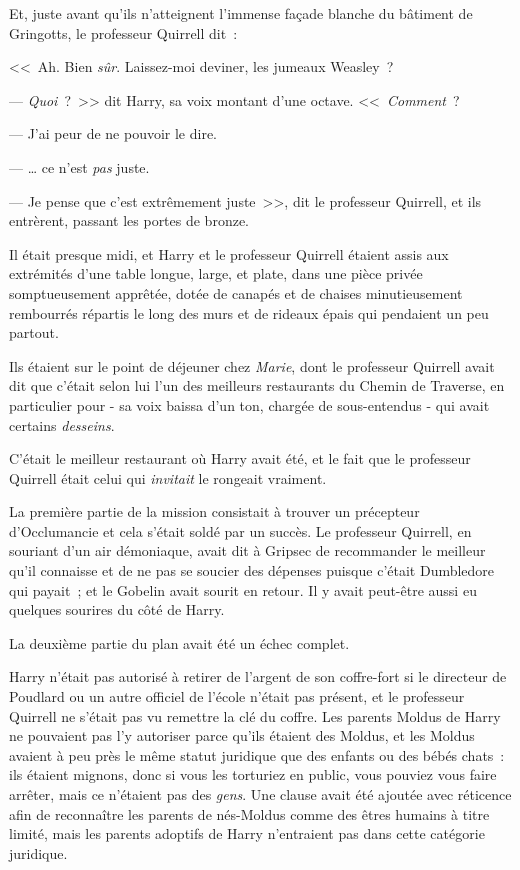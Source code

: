 Et, juste avant qu'ils n'atteignent l'immense façade blanche du bâtiment de Gringotts, le professeur Quirrell dit~:

<<~Ah. Bien \emph{sûr}. Laissez-moi deviner, les jumeaux Weasley~?

--- \emph{Quoi}~?~>> dit Harry, sa voix montant d'une octave. <<~\emph{Comment}~?

--- J'ai peur de ne pouvoir le dire.

--- … ce n'est \emph{pas} juste.

--- Je pense que c'est extrêmement juste~>>, dit le professeur Quirrell, et ils entrèrent, passant les portes de bronze.

\later

Il était presque midi, et Harry et le professeur Quirrell étaient assis aux extrémités d'une table longue, large, et plate, dans une pièce privée somptueusement apprêtée, dotée de canapés et de chaises minutieusement rembourrés répartis le long des murs et de rideaux épais qui pendaient un peu partout.

Ils étaient sur le point de déjeuner chez \emph{Marie}, dont le professeur Quirrell avait dit que c'était selon lui l'un des meilleurs restaurants du Chemin de Traverse, en particulier pour - sa voix baissa d'un ton, chargée de sous-entendus - qui avait certains \emph{desseins}.

C'était le meilleur restaurant où Harry avait été, et le fait que le professeur Quirrell était celui qui \emph{invitait} le rongeait vraiment.

La première partie de la mission consistait à trouver un précepteur d'Occlumancie et cela s'était soldé par un succès. Le professeur Quirrell, en souriant d'un air démoniaque, avait dit à Gripsec de recommander le meilleur qu'il connaisse et de ne pas se soucier des dépenses puisque c'était Dumbledore qui payait~; et le Gobelin avait sourit en retour. Il y avait peut-être aussi eu quelques sourires du côté de Harry.

La deuxième partie du plan avait été un échec complet.

Harry n'était pas autorisé à retirer de l'argent de son coffre-fort si le directeur de Poudlard ou un autre officiel de l'école n'était pas présent, et le professeur Quirrell ne s'était pas vu remettre la clé du coffre. Les parents Moldus de Harry ne pouvaient pas l'y autoriser parce qu'ils étaient des Moldus, et les Moldus avaient à peu près le même statut juridique que des enfants ou des bébés chats~: ils étaient mignons, donc si vous les torturiez en public, vous pouviez vous faire arrêter, mais ce n'étaient pas des \emph{gens}. Une clause avait été ajoutée avec réticence afin de reconnaître les parents de nés-Moldus comme des êtres humains à titre limité, mais les parents adoptifs de Harry n'entraient pas dans cette catégorie juridique.

